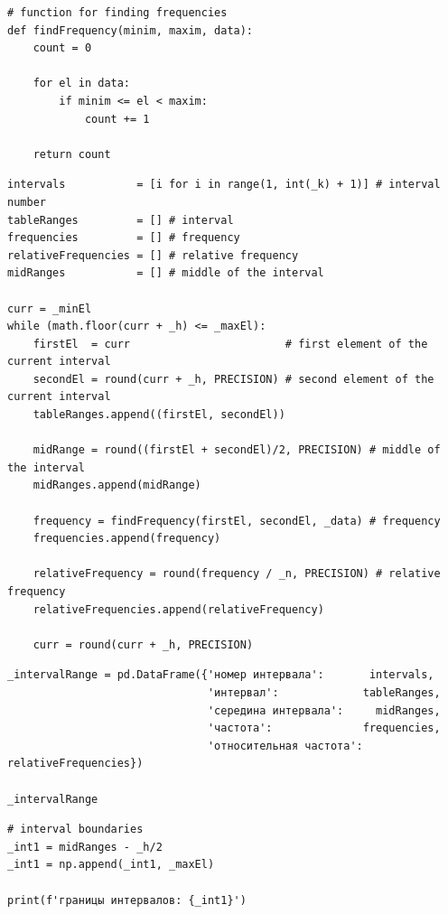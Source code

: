 \documentclass[a4paper, 14pt]{extarticle}
\begin{document}
\begin{lstlisting}[caption={Функция для нахождения частот}, label={lst:5}]
# function for finding frequencies
def findFrequency(minim, maxim, data):
    count = 0

    for el in data:
        if minim <= el < maxim:
            count += 1

    return count
\end{lstlisting}
    
\begin{lstlisting}[caption={Группировка данных}, label={lst:6}]
intervals           = [i for i in range(1, int(_k) + 1)] # interval number
tableRanges         = [] # interval
frequencies         = [] # frequency
relativeFrequencies = [] # relative frequency
midRanges           = [] # middle of the interval

curr = _minEl
while (math.floor(curr + _h) <= _maxEl):
    firstEl  = curr                        # first element of the current interval 
    secondEl = round(curr + _h, PRECISION) # second element of the current interval
    tableRanges.append((firstEl, secondEl))

    midRange = round((firstEl + secondEl)/2, PRECISION) # middle of the interval
    midRanges.append(midRange)

    frequency = findFrequency(firstEl, secondEl, _data) # frequency
    frequencies.append(frequency)                          
    
    relativeFrequency = round(frequency / _n, PRECISION) # relative frequency
    relativeFrequencies.append(relativeFrequency)

    curr = round(curr + _h, PRECISION)
\end{lstlisting}

\begin{lstlisting}[caption={Оформление данных в виде таблицы}, label={lst:7}]
_intervalRange = pd.DataFrame({'номер интервала':       intervals, 
                               'интервал':             tableRanges, 
                               'середина интервала':     midRanges,
                               'частота':              frequencies,
                               'относительная частота': relativeFrequencies})

_intervalRange
\end{lstlisting}

\begin{lstlisting}[caption={Поиск границ интервалов}, label={lst:8}]
# interval boundaries
_int1 = midRanges - _h/2
_int1 = np.append(_int1, _maxEl)

print(f'границы интервалов: {_int1}')
\end{lstlisting}
\end{document}
